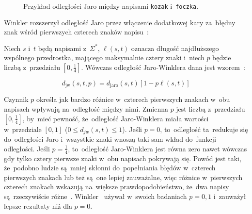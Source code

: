 \documentclass{praca1}
\begin{document}
\begin{figure}[width=80pt]
\centering
{}
\cprotect\caption{Przykład odległości Jaro między napisami \verb|kozak| i~\verb|foczka|.}\label{rys:005}
\end{figure}


Winkler rozszerzył odległość Jaro przez włączenie dodatkowej kary za~błędny znak wśród pierwszych czterech znaków napisu~\cite{Loo2014:stringdist}:

\begin{definition}
Niech $s$ i~$t$ będą napisami z~$\Sigma^*$, $\ell(s,t)$ oznacza długość najdłuższego wspólnego przedrostka, mającego maksymalnie cztery znaki i~niech $p$ będzie liczbą z~przedziału $[0, \frac{1}{4}]$. Wówczas odległość Jaro-Winklera dana jest wzorem~\cite{Winkler1990:stringcomparator}:

\begin{equation}
\label{eq:012}
d_{\mathrm{jw}}(s,t, p) = d_{\mathrm{jaro}}(s,t)[1 - p\ell(s,t)]
\end{equation}
\end{definition}

Czynnik $p$ określa jak bardzo różnice w~czterech pierwszych znakach w~obu napisach wpływają na~odległość między nimi. Zmienna $p$ jest liczbą z~przedziału $[0, \frac{1}{4}]$, by~mieć pewność, że~odległość Jaro-Winklera miała wartości w~przedziale $[0,1]$ ($0 \leq d_{jw}(s,t) \leq 1$). Jeśli $p=0$, to~odległość ta~redukuje się do~odległości Jaro i~wszystkie znaki wnoszą taki sam wkład do~funkcji odległości. Jeśli $p = \frac{1}{4}$, to~odległość Jaro-Winklera jest równa zero nawet wówczas gdy tylko cztery pierwsze znaki w~obu napisach pokrywają się. Powód jest taki, że~podobno ludzie są~mniej skłonni do~popełniania błędów w~czterech pierwszych znakach lub też są~one lepiej zauważalne, więc różnice w~pierwszych czterech znakach wskazują na~większe prawdopodobieństwo, że~dwa napisy są~rzeczywiście różne~\cite{Loo2014:stringdist}. Winkler~\cite{Winkler1990:stringcomparator} używał w~swoich badaniach $p = 0,1$ i~zauważył lepsze rezultaty niż dla $p = 0$.
\end{document}
